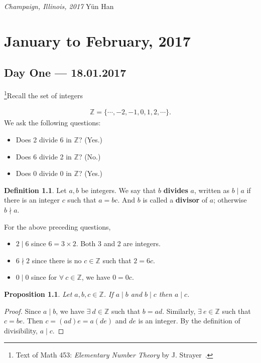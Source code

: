 \documentclass{amsbook}
\theoremstyle{plain}
\newtheorem{proposition}[theorem]{Proposition}
\theoremstyle{definition}
\newtheorem{definition}[theorem]{Definition}
\theoremstyle{remark}
\numberwithin{equation}{chapter}
\numberwithin{figure}{chapter}
\begin{document}
\vspace{10mm}
\noindent \emph{Champaign, Illinois, 2017} \hfill {\sc Y\"un Han}

\mainmatter

\part{January to February, 2017}\label{part1} %
\chapter[Lecture One]{Day One \hfill {\footnotesize \rm --- 18.01.2017}}

\footnote{Text of Math 453: \emph{Elementary Number Theory} by J. Strayer~\cite{Strayer2001}.}Recall the set of integers

\begin{align}
\mathbb{Z} = \{ \cdots, -2, -1, 0, 1, 2, \cdots \}.
\end{align}
We ask the following questions:
\begin{itemize}
\item Does 2 divide 6 in $\mathbb{Z}$? (Yes.)
\item Does 6 divide 2 in $\mathbb{Z}$? (No.)
\item Does 0 divide 0 in $\mathbb{Z}$? (Yes.)
\end{itemize}

\begin{definition}
Let $a, b$ be integers. We say that $b$ \textbf{divides} $a$, written as $b \mid a$ if there is an integer $c$ such that $a = bc$. And $b$ is called a \textbf{divisor} of $a$; otherwise $b \nmid a$.
\end{definition}

For the above preceding questions, 
\begin{itemize}
\item $2 \mid 6$ since $6 = 3 \times 2$. Both 3 and 2 are integers.
\item $6 \nmid 2$ since  there is no $c \in \mathbb{Z}$ such that $2 = 6c$.
\item $0 \mid 0$ since for $\forall~ c \in \mathbb{Z}$, we have $0 = 0c$.
\end{itemize}

\begin{proposition}\label{prop:div_trans}
Let $a, b, c \in \mathbb{Z}$. If $a \mid b$ and $b \mid c$ then $a \mid c$.
\end{proposition}
\begin{proof}
Since $a \mid b$, we have $\exists~ d \in \mathbb{Z}$ such that $b = ad$. Similarly, $\exists~ e \in \mathbb{Z}$ such that $c = be$. Then $c = (ad)e = a(de)$ and $de$ is an integer. By the definition of divisibility, $a \mid c$.
\end{proof}
\end{document}
